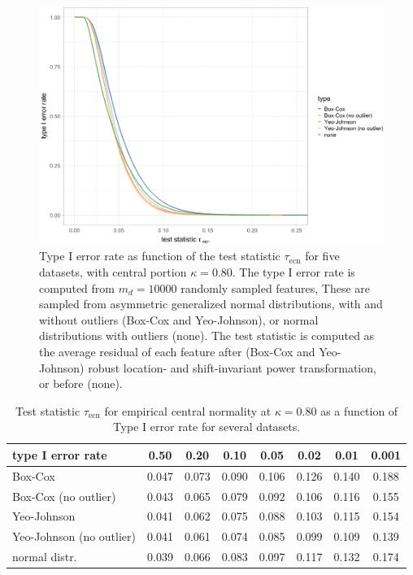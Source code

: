 \documentclass[preprint,12pt,authoryear]{elsarticle}
\begin{document}
\begin{figure}

{\centering \includegraphics{figure_appendix_4} 

}

\caption{Type I error rate as function of the test statistic $\tau_{\text{ecn}}$ for five datasets, with central portion $\kappa=0.80$. The type I error rate is computed from $m_d=10000$ randomly sampled features, These are sampled from asymmetric generalized normal distributions, with and without outliers (Box-Cox and Yeo-Johnson), or normal distributions with outliers (none). The test statistic is computed as the average residual of each feature after (Box-Cox and Yeo-Johnson) robust location- and shift-invariant power transformation, or before (none).}\label{fig:empirical-central-normality-test-appendix}
\end{figure}

\begin{table}
\begin{center}
\caption{Test statistic $\tau_{\text{ecn}}$ for empirical central normality at $\kappa = 0.80$ as a function of Type I error rate for several datasets.}
\label{tab:empirical-central-normality-appendix}
\begin{tabular}{l | c c c c c c c}

\toprule
type I error rate & 0.50 & 0.20 & 0.10 & 0.05 & 0.02 & 0.01 & 0.001 \\

\midrule
Box-Cox                  & 0.047 & 0.073 & 0.090 & 0.106 & 0.126 & 0.140 & 0.188 \\
Box-Cox (no outlier)     & 0.043 & 0.065 & 0.079 & 0.092 & 0.106 & 0.116 & 0.155 \\
Yeo-Johnson              & 0.041 & 0.062 & 0.075 & 0.088 & 0.103 & 0.115 & 0.154 \\
Yeo-Johnson (no outlier) & 0.041 & 0.061 & 0.074 & 0.085 & 0.099 & 0.109 & 0.139 \\
normal distr.            & 0.039 & 0.066 & 0.083 & 0.097 & 0.117 & 0.132 & 0.174 \\
\bottomrule
\end{tabular}
\end{center}
\end{table}
\end{document}
